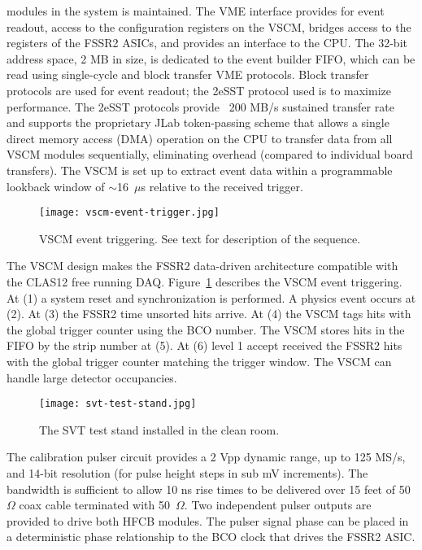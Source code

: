modules in the system is maintained. The VME interface provides for event readout, access to the configuration registers on the VSCM, bridges access to the registers of the FSSR2 ASICs, and provides an interface to the CPU. The 32-bit address space, 2 MB in size, is dedicated to the event builder FIFO, which can be read using single-cycle and block transfer VME protocols. Block transfer protocols are used for event readout; the 2eSST protocol used is to maximize performance. The 2eSST protocols provide ~200 MB/s sustained transfer rate and supports the proprietary JLab token-passing scheme that allows a single direct memory access (DMA) operation on the CPU to transfer data from all VSCM modules sequentially, eliminating overhead (compared to individual board transfers). The VSCM is set up to extract event data within a programmable lookback window of $\sim$16~$\mu$s relative to the received trigger. 

\begin{figure}[hbt] 
\centering 
\texttt{[image: vscm-event-trigger.jpg]}
\caption{VSCM event triggering. See text for description of the sequence.}
\label{fig:vscm-event-trigger}
\end{figure}

The VSCM design makes the FSSR2 data-driven architecture compatible with the CLAS12 free running DAQ. Figure~\ref{fig:vscm-event-trigger} describes the VSCM event triggering. At (1) a system reset and synchronization is performed. A physics event occurs at (2). At (3) the FSSR2 time unsorted hits arrive. At (4) the VSCM tags hits with the global trigger counter using the BCO number. The VSCM stores hits in the FIFO by the strip number at (5). At (6) level 1 accept received the FSSR2 hits with the global trigger counter matching the trigger window. The VSCM can handle large detector occupancies.

\begin{figure}[hbt] 
\centering 
\texttt{[image: svt-test-stand.jpg]}
\caption{The SVT test stand installed in the clean room.}
\label{fig:svt-test-stand}
\end{figure}

The calibration pulser circuit provides a 2 Vpp dynamic range, up to 125 MS/s, and 14-bit resolution (for pulse height steps in sub mV increments). The bandwidth is sufficient to allow 10 ns rise times to be delivered over 15 feet of 50~$\Omega$ coax cable terminated with 50~$\Omega$. Two independent pulser outputs are provided to drive both HFCB modules. The pulser signal phase can be placed in a deterministic phase relationship to the BCO clock that drives the FSSR2 ASIC. 

